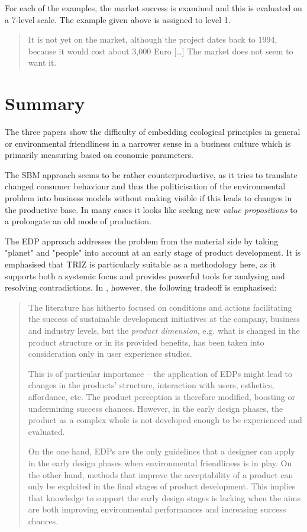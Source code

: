 \documentclass[11pt,a4paper]{article}
\begin{document}
For each of the examples, the market success is examined and this is evaluated
on a 7-level scale.  The example given above is assigned to level 1. 
\begin{quote}
  It is not yet on the market, although the project dates back to 1994,
  because it would cost about 3,000 Euro [\ldots] The market does not seem to
  want it.
\end{quote}

\section{Summary}

The three papers show the difficulty of embedding ecological principles in
general or environmental friendliness in a narrower sense in a business
culture which is primarily measuring based on economic parameters.

The SBM approach seems to be rather counterproductive, as it tries to
translate changed consumer behaviour and thus the politicisation of the
environmental problem into business models without making visible if this
leads to changes in the productive base.  In many cases it looks like seekng
new \emph{value propositions} to a prolongate an old mode of production.  

The EDP approach addresses the problem from the material side by taking
"planet" and "people" into account at an early stage of product development.
It is emphasised that TRIZ is particularly suitable as a methodology here, as
it supports both a systemic focus and provides powerful tools for analysing
and resolving contradictions. In \cite{Maccioni2019}, however, the following
tradeoff is emphasised:
\begin{quote}
  The literature has hitherto focused on conditions and actions facilitating
  the success of sustainable development initiatives at the company, business
  and industry levels, but the \emph{product dimension}, e.g. what is changed
  in the product structure or in its provided benefits, has been taken into
  consideration only in user experience studies.

  This is of particular importance – the application of EDPs might lead to
  changes in the products’ structure, interaction with users, esthetics,
  affordance, etc. The product perception is therefore modified, boosting or
  undermining success chances. However, in the early design phases, the
  product as a complex whole is not developed enough to be experienced and
  evaluated.

  On the one hand, EDPs are the only guidelines that a designer can apply in
  the early design phases when environmental friendliness is in play. On the
  other hand, methods that improve the acceptability of a product can only be
  exploited in the final stages of product development. This implies that
  knowledge to support the early design stages is lacking when the aims are
  both improving environmental performances and increasing success chances.
\end{quote}
\end{document}
